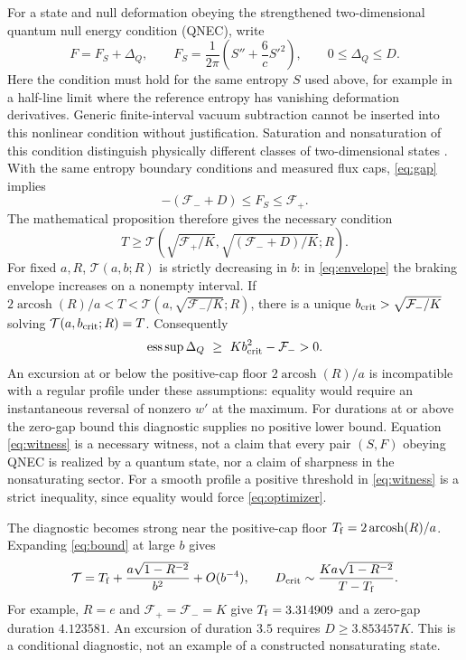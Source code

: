 \documentclass[10pt]{article}
\newcommand{\arcosh}{\operatorname{arcosh}}
\newcommand{\esssup}{\operatorname*{ess\,sup}}
\begin{document}
For a state and null deformation obeying the strengthened two-dimensional
quantum null energy condition (QNEC), write
\begin{equation}
 F=F_S+\Delta_Q,\qquad
 F_S=\frac1{2\pi}\left(S''+\frac6c S'^2\right),\qquad
 0\le\Delta_Q\le D.
 \label{eq:gap}
\end{equation}
Here the condition must hold for the same entropy $S$ used above, for example
in a half-line limit where the reference entropy has vanishing deformation
derivatives. Generic finite-interval vacuum subtraction cannot be inserted
into this nonlinear condition without justification.
Saturation and nonsaturation of this condition distinguish physically different
classes of two-dimensional states \cite{Ecker}. With the same entropy
boundary conditions and measured flux caps, \eqref{eq:gap} implies
\begin{equation}
 -(\mathcal F_-+D)\le F_S\le\mathcal F_+.
\end{equation}
The mathematical proposition therefore gives the necessary condition
\begin{equation}
 T\ge\mathcal T\left(\sqrt{\mathcal F_+/K},
                     \sqrt{(\mathcal F_-+D)/K};R\right).
 \label{eq:gapbound}
\end{equation}
For fixed $a,R$, $\mathcal T(a,b;R)$ is strictly decreasing in $b$:
in \eqref{eq:envelope} the braking envelope increases on a nonempty interval.
If
$2\arcosh(R)/a<T<\mathcal T(a,\sqrt{\mathcal F_-/K};R)$,
there is a unique $b_{\rm crit}>\sqrt{\mathcal F_-/K}$ solving
$\mathcal T(a,b_{\rm crit};R)=T$. Consequently
\begin{equation}
 \esssup\Delta_Q\ \ge\ Kb_{\rm crit}^{2}-\mathcal F_->0.
 \label{eq:witness}
\end{equation}
An excursion at or below the positive-cap floor $2\arcosh(R)/a$ is incompatible
with a regular profile under these assumptions: equality would require an
instantaneous reversal of nonzero $w'$ at the maximum. For durations at or above the zero-gap bound this
diagnostic supplies no positive lower bound. Equation \eqref{eq:witness} is
a necessary witness, not a claim that every pair $(S,F)$ obeying QNEC is
realized by a quantum state, nor a claim of sharpness in the nonsaturating sector.
For a smooth profile a positive threshold in \eqref{eq:witness} is a strict
inequality, since equality would force \eqref{eq:optimizer}.

The diagnostic becomes strong near the positive-cap floor
$T_{\rm f}=2\arcosh(R)/a$. Expanding \eqref{eq:bound} at large $b$ gives
\begin{equation}
 \mathcal T=T_{\rm f}+\frac{a\sqrt{1-R^{-2}}}{b^2}+O(b^{-4}),\qquad
 D_{\rm crit}\sim\frac{Ka\sqrt{1-R^{-2}}}{T-T_{\rm f}}.
 \label{eq:divergence}
\end{equation}
For example, $R=e$ and $\mathcal F_+=\mathcal F_-=K$ give
$T_{\rm f}=3.314909$ and a zero-gap duration $4.123581$. An excursion of
duration $3.5$ requires $D\ge3.853457K$. This is a conditional diagnostic,
not an example of a constructed nonsaturating state.
\end{document}
